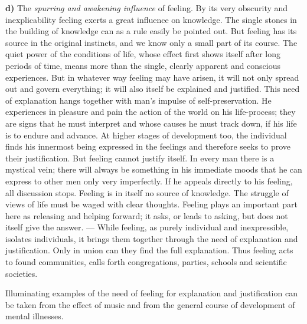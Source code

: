 \documentclass[12pt,a4paper]{book}
\newcommand{\opage}[1]{\marginnote{\footnotesize\textit{[#1]}}}
\begin{document}
\textbf{d)} The \emph{spurring and awakening influence} of feeling. By
its very obscurity and inexplicability feeling exerts a great influence
on knowledge. The single stones in the building of knowledge can as a
rule easily be pointed out. But feeling has its source in the original
instincts, and we know only a small part of its course. The quiet power
of the conditions of life, whose effect first shows itself after long
periods of time, means more than the single, clearly apparent and
conscious experiences. But in whatever way feeling may have arisen, it
will not only spread out and govern everything;
\opage{361}it will also itself be explained and justified. This need of
explanation hangs together with man's impulse of self-preservation. He
experiences in pleasure and pain the action of the world on his
life-process; they are signs that he must interpret and whose causes he
must track down, if his life is to endure and advance. At higher stages
of development too, the individual finds his innermost being expressed
in the feelings and therefore seeks to prove their justification. But
feeling cannot justify itself. In every man there is a mystical vein;
there will always be something in his immediate moods that he can
express to other men only very imperfectly. If he appeals directly to
his feeling, all discussion stops. Feeling is in itself no source of
knowledge. The struggle of views of life must be waged with clear
thoughts. Feeling plays an important part here as releasing and
helping forward; it asks, or leads to asking, but does not itself give
the answer. --- While feeling, as purely individual and inexpressible,
isolates individuals, it brings them together through the need of
explanation and justification. Only in union can they find the full
explanation. Thus feeling acts to found communities, calls forth
congregations, parties, schools and scientific societies.

Illuminating examples of the need of feeling for explanation and
justification can be taken from the effect of music and from the
general course of development of mental illnesses.
\end{document}
